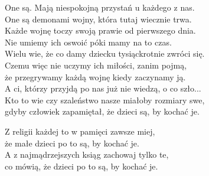 \begin{text}
    One są. Mają niespokojną przystań u każdego z nas.\\
    One są demonami wojny, która tutaj wiecznie trwa.\\
    Każde wojnę toczy swoją prawie od pierwszego dnia.\\
    Nie umiemy ich oswoić póki mamy na to czas.\\
    Wielu wie, że co damy dziecku tysiąckrotnie zwróci się.\\
    Czemu więc nie uczymy ich miłości, zanim pojmą,\\
    że przegrywamy każdą wojnę kiedy zaczynamy ją.\\
    A ci, którzy przyjdą po nas już nie wiedzą, o co szło...\\
    Kto to wie czy szaleństwo nasze miałoby rozmiary swe,\\
    gdyby człowiek zapamiętał, że dzieci są, by kochać je.

    Z religii każdej to w pamięci zawsze miej,\\
    że małe dzieci po to są, by kochać je.\\
    A z najmądrzejszych ksiąg zachowaj tylko te,\\
    co mówią, że dzieci po to są, by kochać je.
\end{text}
\begin{chord}

\end{chord}